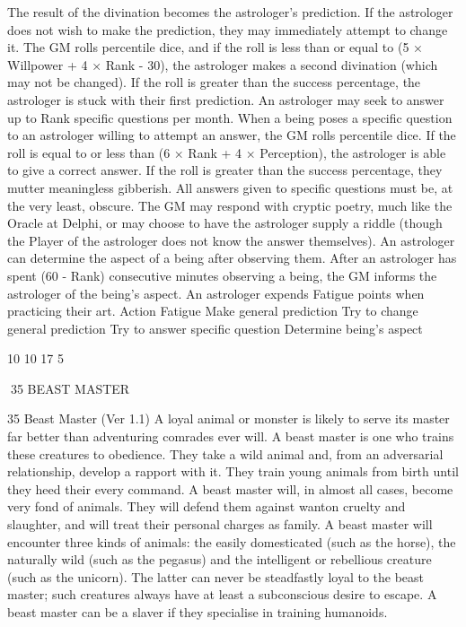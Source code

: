 \documentclass[a4paper]{article}
\begin{document}
\begin{multicols}{3}
The result of the divination becomes the astrologer’s prediction. If the astrologer does not wish to
make the prediction, they may immediately attempt
to change it. The GM rolls percentile dice, and if
the roll is less than or equal to (5 × Willpower + 4
× Rank - 30), the astrologer makes a second divination (which may not be changed). If the roll is
greater than the success percentage, the astrologer
is stuck with their first prediction.
An astrologer may seek to answer up to Rank
specific questions per month.
When a being poses a specific question to an astrologer willing to attempt an answer, the GM rolls
percentile dice. If the roll is equal to or less than (6
× Rank + 4 × Perception), the astrologer is able to
give a correct answer. If the roll is greater than the
success percentage, they mutter meaningless gibberish.
All answers given to specific questions must be, at
the very least, obscure. The GM may respond with
cryptic poetry, much like the Oracle at Delphi, or
may choose to have the astrologer supply a riddle
(though the Player of the astrologer does not know
the answer themselves).
An astrologer can determine the aspect of a
being after observing them.
After an astrologer has spent (60 - Rank) consecutive minutes observing a being, the GM informs
the astrologer of the being’s aspect.
An astrologer expends Fatigue points when
practicing their art.
Action
Fatigue
Make general prediction
Try to change general prediction
Try to answer specific question
Determine being’s aspect

10
10
17
5

35 BEAST MASTER

35 Beast Master (Ver 1.1)
A loyal animal or monster is likely to serve its
master far better than adventuring comrades ever
will. A beast master is one who trains these creatures to obedience. They take a wild animal and,
from an adversarial relationship, develop a rapport
with it. They train young animals from birth until
they heed their every command. A beast master
will, in almost all cases, become very fond of animals. They will defend them against wanton cruelty and slaughter, and will treat their personal
charges as family.
A beast master will encounter three kinds of animals: the easily domesticated (such as the horse),
the naturally wild (such as the pegasus) and the
intelligent or rebellious creature (such as the unicorn). The latter can never be steadfastly loyal to
the beast master; such creatures always have at
least a subconscious desire to escape. A beast
master can be a slaver if they specialise in training
humanoids.


\end{multicols}
\end{document}
